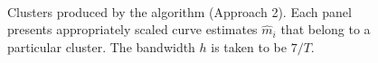 \documentclass[a4paper,12pt]{article}
\numberwithin{equation}{section}
\begin{document}
\begin{figure}
\\
\hspace{0.25cm}
\caption{Clusters produced by the algorithm (Approach 2). Each panel presents appropriately scaled curve estimates $\hat{m}_i$ that belong to a particular cluster. The bandwidth $h$ is taken to be $7/T$.}\label{fig:clusters_alt_14days}
\end{figure}

\clearpage

{\small
\setlength{\bibsep}{0.35em}
}
\end{document}
